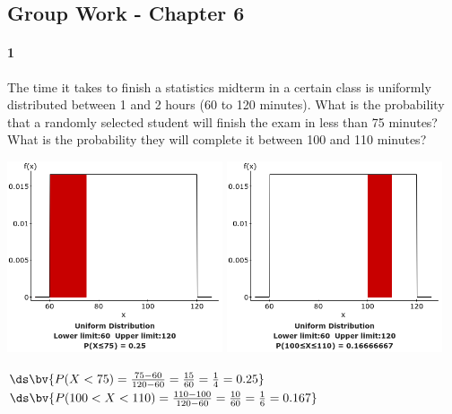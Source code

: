 \documentclass{article}
\begin{document}
\begin{flushleft}
\section*{Group Work - Chapter 6}
\paragraph{1}
\begin{enumalpha}
\item The time it takes to finish a statistics midterm in a certain class is uniformly distributed between 1 and 2 hours (60 to 120 minutes). What is the probability that a randomly selected student will finish the exam in less than 75 minutes? What is the probability they will complete it between 100 and 110 minutes?\\
\medskip
{\centering
\includegraphics[width=2.5in]{images/grp06_Q1_a_1} \qquad
\includegraphics[width=2.5in]{images/grp06_Q1_a_2}
\par}
$\ds\bv{P(X < 75) = \frac {75 - 60}{120-60} = \frac{15}{60} = \frac 1 4 = 0.25}$\\
\medskip
$\ds\bv{P(100 < X < 110) = \frac{110 - 100}{120 -60} = \frac {10}{60} = \frac 1 6 = 0.167}$
\vspace{.5in}


\end{enumalpha}
\end{flushleft}
\end{document}
